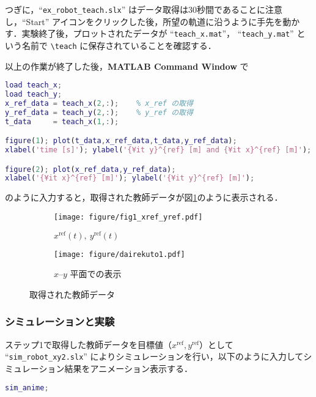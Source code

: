 つぎに，“\texttt{ex\_robot\_teach.slx}” はデータ取得は30秒間であることに注意し，“Start” アイコンをクリックした後，所望の軌道に沿うように手先を動かす．実験終了後，プロットされたデータが “\texttt{teach\_x.mat}”， “\texttt{teach\_y.mat}” という名前で \texttt{\textbackslash teach} に保存されていることを確認する．

以上の作業が終了した後，\textbf{MATLAB Command Window} で

\begin{lstlisting}[language=Matlab]
load teach_x;
load teach_y;
x_ref_data = teach_x(2,:);    % x_ref の取得
y_ref_data = teach_y(2,:);    % y_ref の取得
t_data     = teach_x(1,:);    

figure(1); plot(t_data,x_ref_data,t_data,y_ref_data);
xlabel('time [s]'); ylabel('{¥it y}^{ref} [m] and {¥it x}^{ref} [m]');

figure(2); plot(x_ref_data,y_ref_data);
xlabel('{¥it x}^{ref} [m]'); ylabel('{¥it y}^{ref} [m]');
\end{lstlisting}

のように入力すると，取得された教師データが図\ref{fig:teaching_data}のように表示される．

\begin{figure}[H]
    \centering
    \begin{subfigure}[b]{0.45\linewidth}
        \centering
        \texttt{[image: figure/fig1\_xref\_yref.pdf]}
        \caption{$x^{\mathrm{ref}}(t),\ y^{\mathrm{ref}}(t)$}
    \end{subfigure}
    \begin{subfigure}[b]{0.45\linewidth}
        \centering
        \texttt{[image: figure/dairekuto1.pdf]}
        \caption{$x$--$y$ 平面での表示}
    \end{subfigure}
    \caption{取得された教師データ}
    \label{fig:teaching_data}
\end{figure}

\subsubsection{シミュレーションと実験}
ステップ1で取得した教師データを目標値（$x^{\mathrm{ref}}, y^{\mathrm{ref}}$）として “\texttt{sim\_robot\_xy2.slx}” によりシミュレーションを行い，以下のように入力してシミュレーション結果をアニメーション表示する．

\begin{lstlisting}[language=Matlab]
sim_anime;
\end{lstlisting}

